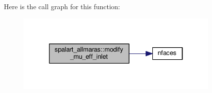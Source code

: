 Here is the call graph for this function\-:\nopagebreak
\begin{figure}[H]
\begin{center}
\leavevmode
\includegraphics[width=286pt]{classspalart__allmaras_a39fb7d437ed286f6c825ef0533461cea_cgraph}
\end{center}
\end{figure}




